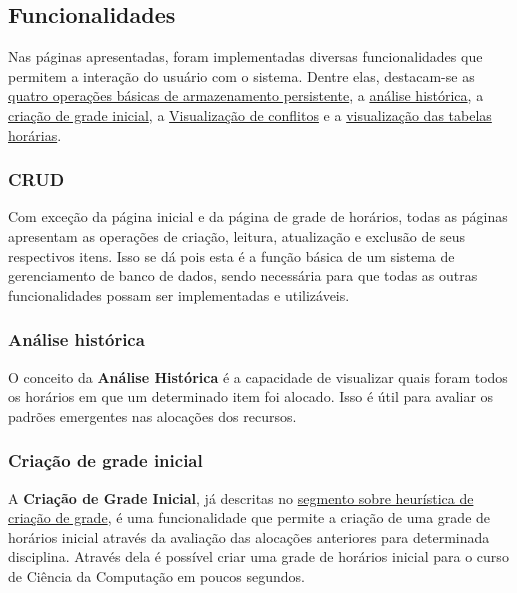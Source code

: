 \subsection{Funcionalidades} \label{ssec:funcionalidades}

Nas páginas apresentadas, foram implementadas diversas funcionalidades que permitem a interação do usuário com o sistema. Dentre elas, destacam-se as \hyperref[sssec:CRUD]{quatro operações básicas de armazenamento persistente}, a \hyperref[sssec:Análise histórica]{análise histórica}, a \hyperref[sssec:Criação de grade inicial]{criação de grade inicial}, a \hyperref[sssec:Visualização de conflitos]{Visualização de conflitos} e a \hyperref[sssec:Visualização de tabelas horárias]{visualização das tabelas horárias}.

\subsubsection{CRUD} \label{sssec:CRUD}

Com exceção da página inicial e da página de grade de horários, todas as páginas apresentam as operações de criação, leitura, atualização e exclusão de seus respectivos itens. Isso se dá pois esta é a função básica de um sistema de gerenciamento de banco de dados, sendo necessária para que todas as outras funcionalidades possam ser implementadas e utilizáveis.

\subsubsection{Análise histórica} \label{sssec:Análise histórica}

O conceito da \textbf{Análise Histórica} é a capacidade de visualizar quais foram todos os horários em que um determinado item foi alocado. Isso é útil para avaliar os padrões emergentes nas alocações dos recursos.

\subsubsection{Criação de grade inicial} \label{sssec:Criação de grade inicial}

A \textbf{Criação de Grade Inicial}, já descritas no \hyperref[ssec:Heurística]{segmento sobre heurística de criação de grade}, é uma funcionalidade que permite a criação de uma grade de horários inicial através da avaliação das alocações anteriores para determinada disciplina. Através dela é possível criar uma grade de horários inicial para o curso de Ciência da Computação em poucos segundos.

